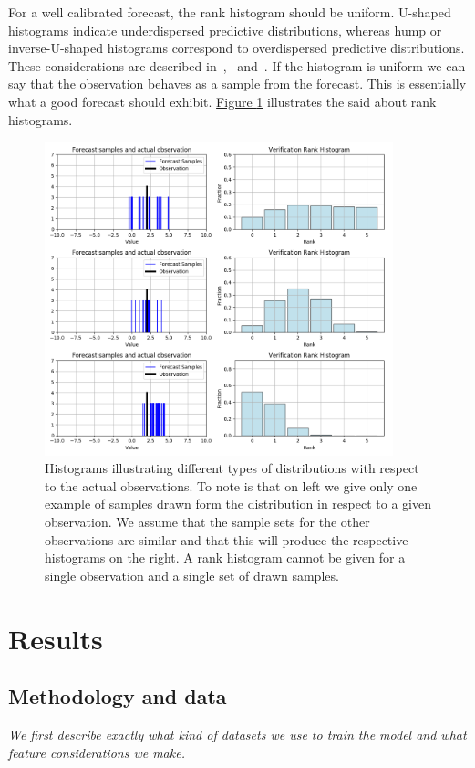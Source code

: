 \documentclass[12pt,a4paper,twoside]{scrartcl}
\numberwithin{equation}{section}
\newcommand{\reffig}[1]{\hyperref[#1]{Figure \ref*{#1}}}
\begin{document}
For a well calibrated forecast, the rank histogram should be uniform. U-shaped histograms indicate underdispersed predictive distributions, whereas hump or inverse-U-shaped histograms correspond to overdispersed predictive distributions. These considerations are described in~\cite{gneiting2014},~\cite{diebold1998} and~\cite{hamill2001}. If the histogram is uniform we can say that the observation behaves as a sample from the forecast. This is essentially what a good forecast should exhibit. \reffig{fig:rank-hist} illustrates the said about rank histograms.
\begin{center}
  \begin{figure}[H]
    \centering
    \includegraphics[height=0.75\textwidth, width=0.9\textwidth]{figures/verification_histogram.png}
    \caption[Rank Histogram Example]{Histograms illustrating different types of distributions with respect to the actual observations. To note is that on left we give only one example of samples drawn form the distribution in respect to a given observation. We assume that the sample sets for the other observations are similar and that this will produce the respective histograms on the right. A rank histogram cannot be given for a single observation and a single set of drawn samples.}\label{fig:rank-hist}
  \end{figure}
\end{center}
\section{Results}\label{sec:res}
\subsection{Methodology and data}\label{sec:preprop-meth}
\noindent
\emph{We first describe exactly what kind of datasets we use to train the model and what feature considerations we make.}
\end{document}

